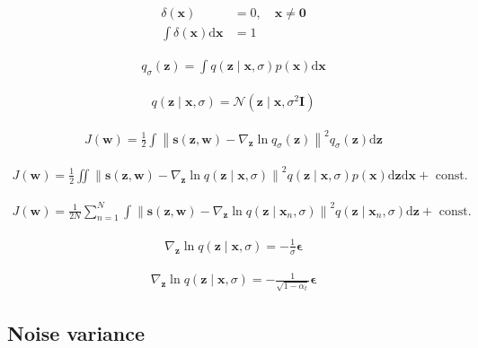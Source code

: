 \documentclass{article}
\begin{document}
\begin{align*}
\delta(\mathbf{x}) & =0, \quad \mathbf{x} \neq \mathbf{0}  
\tag{20.45}\\
\int \delta(\mathbf{x}) \mathrm{d} \mathbf{x} & =1
\tag{20.46}
\end{align*}

\begin{align*}
q_{\sigma}(\mathbf{z})=\int q(\mathbf{z} \mid \mathbf{x}, \sigma) p(\mathbf{x}) \mathrm{d} \mathbf{x} 
\tag{20.47}
\end{align*}

\begin{align*}
q(\mathbf{z} \mid \mathbf{x}, \sigma)=\mathcal{N}\left(\mathbf{z} \mid \mathbf{x}, \sigma^{2} \mathbf{I}\right) 
\tag{20.48}
\end{align*}

\begin{align*}
J(\mathbf{w})=\frac{1}{2} \int\left\|\mathbf{s}(\mathbf{z}, \mathbf{w})-\nabla_{\mathbf{z}} \ln q_{\sigma}(\mathbf{z})\right\|^{2} q_{\sigma}(\mathbf{z}) \mathrm{d} \mathbf{z} 
\tag{20.49}
\end{align*}

\begin{align*}
J(\mathbf{w})=\frac{1}{2} \iint\left\|\mathbf{s}(\mathbf{z}, \mathbf{w})-\nabla_{\mathbf{z}} \ln q(\mathbf{z} \mid \mathbf{x}, \sigma)\right\|^{2} q(\mathbf{z} \mid \mathbf{x}, \sigma) p(\mathbf{x}) \mathrm{d} \mathbf{z} \mathrm{d} \mathbf{x}+\text{ const. } 
\tag{20.50}
\end{align*}

\begin{align*}
J(\mathbf{w})=\frac{1}{2 N} \sum_{n=1}^{N} \int\left\|\mathbf{s}(\mathbf{z}, \mathbf{w})-\nabla_{\mathbf{z}} \ln q\left(\mathbf{z} \mid \mathbf{x}_{n}, \sigma\right)\right\|^{2} q\left(\mathbf{z} \mid \mathbf{x}_{n}, \sigma\right) \mathrm{d} \mathbf{z}+\text{ const. } 
\tag{20.51}
\end{align*}

\begin{align*}
\nabla_{\mathbf{z}} \ln q(\mathbf{z} \mid \mathbf{x}, \sigma)=-\frac{1}{\sigma} \boldsymbol{\epsilon} 
\tag{20.52}
\end{align*}

\begin{align*}
\nabla_{\mathbf{z}} \ln q(\mathbf{z} \mid \mathbf{x}, \sigma)=-\frac{1}{\sqrt{1-\alpha_{t}}} \boldsymbol{\epsilon} 
\tag{20.53}
\end{align*}

\subsection{Noise variance}
\end{document}
